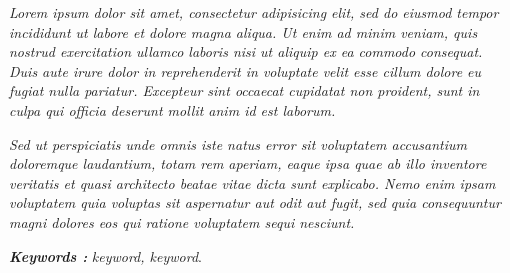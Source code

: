 \documentclass{laporanITB}
\begin{document}
\begin{abstracteng}
\emph{
Lorem ipsum dolor sit amet, consectetur adipisicing elit, sed do eiusmod tempor incididunt ut labore et dolore magna aliqua. Ut enim ad minim veniam, quis nostrud exercitation ullamco laboris nisi ut aliquip ex ea commodo consequat. Duis aute irure dolor in reprehenderit in voluptate velit esse cillum dolore eu fugiat nulla pariatur. Excepteur sint occaecat cupidatat non proident, sunt in culpa qui officia deserunt mollit anim id est laborum.}

\emph{Sed ut perspiciatis unde omnis iste natus error sit voluptatem accusantium doloremque laudantium, totam rem aperiam, eaque ipsa quae ab illo inventore veritatis et quasi architecto beatae vitae dicta sunt explicabo. Nemo enim ipsam voluptatem quia voluptas sit aspernatur aut odit aut fugit, sed quia consequuntur magni dolores eos qui ratione voluptatem sequi nesciunt.}

\bigskip
\noindent
\textbf{\emph{Keywords :}} \emph{keyword, keyword}.
\end{abstracteng}












\end{document}
